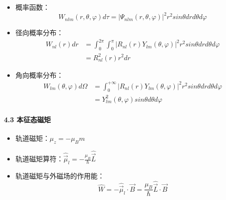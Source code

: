 \documentclass[UTF8,twocolumn]{ctexart}
\providecommand{\tightlist}{%
  \setlength{\itemsep}{0pt}\setlength{\parskip}{0pt}}
\let\oldparagraph\paragraph
\renewcommand{\paragraph}[1]{\oldparagraph{#1}\mbox{}}
\begin{document}
\begin{itemize}
\tightlist
\item
  概率函数：
  \[W_{nlm}(r,\theta,\varphi)d\tau=|\Psi_{nlm}(r,\theta,\varphi)|^2r^2sin\theta drd\theta d\varphi\]
\item
  径向概率分布： \[\begin{aligned}
  W_{nl}(r)dr&=\int_0^{2\pi}\int_0^{\pi}|R_{nl}(r)Y_{lm}(\theta,\varphi)|^2r^2sin\theta drd\theta d\varphi\\
  &=R_{nl}^2(r)r^2dr
  \end{aligned}\]
\item
  角向概率分布： \[\begin{aligned}
  W_{lm}(\theta,\varphi)d\Omega&=\int_0^{+\infty}|R_{nl}(r)Y_{lm}(\theta,\varphi)|^2r^2sin\theta drd\theta d\varphi\\
  &=Y_{lm}^2(\theta,\varphi)sin\theta d\theta d\varphi
  \end{aligned}\]
\end{itemize}

\hypertarget{ux672cux5f81ux6001ux78c1ux77e9}{%
\paragraph{ 4.3 本征态磁矩}\label{ux672cux5f81ux6001ux78c1ux77e9}}

\begin{itemize}
\tightlist
\item
  轨道磁矩：\(\mu_z=-\mu_Bm\)
\item
  轨道磁矩算符：\(\hat{\vec{\mu}}_l=-\frac{\mu_B}{\hbar}\hat{\vec{L}}\)
\item
  轨道磁矩与外磁场的作用能：\[\hat{W}=-\hat{\vec{\mu}}_l\cdot\vec{B}=\frac{\mu_B}{\hbar}\hat{\vec{L}}\cdot\vec{B}\]
\end{itemize}
\end{document}
